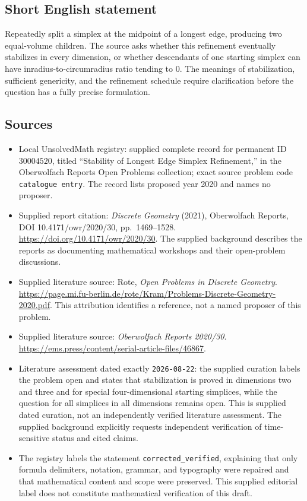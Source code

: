 \documentclass[11pt]{article}
\begin{document}
\subsection{Short English statement}
Repeatedly split a simplex at the midpoint of a longest edge, producing two equal-volume children. The source asks whether this refinement eventually stabilizes in every dimension, or whether descendants of one starting simplex can have inradius-to-circumradius ratio tending to \(0\). The meanings of stabilization, sufficient genericity, and the refinement schedule require clarification before the question has a fully precise formulation.
\subsection{Sources}
\begin{itemize}
\item Local UnsolvedMath registry: supplied complete record for permanent ID \(30004520\), titled ``Stability of Longest Edge Simplex Refinement,'' in the Oberwolfach Reports Open Problems collection; exact source problem code \texttt{catalogue entry}. The record lists proposed year 2020 and names no proposer.
\item Supplied report citation: \emph{Discrete Geometry} (2021), Oberwolfach Reports, DOI 10.4171/owr/2020/30, pp.\ 1469--1528. \url{https://doi.org/10.4171/owr/2020/30}. The supplied background describes the reports as documenting mathematical workshops and their open-problem discussions.
\item Supplied literature source: Rote, \emph{Open Problems in Discrete Geometry}. \url{https://page.mi.fu-berlin.de/rote/Kram/Problems-Discrete-Geometry-2020.pdf}. This attribution identifies a reference, not a named proposer of this problem.
\item Supplied literature source: \emph{Oberwolfach Reports 2020/30}. \url{https://ems.press/content/serial-article-files/46867}.
\item Literature assessment dated exactly \texttt{2026-08-22}: the supplied curation labels the problem open and states that stabilization is proved in dimensions two and three and for special four-dimensional starting simplices, while the question for all simplices in all dimensions remains open. This is supplied dated curation, not an independently verified literature assessment. The supplied background explicitly requests independent verification of time-sensitive status and cited claims.
\item The registry labels the statement \texttt{corrected\_verified}, explaining that only formula delimiters, notation, grammar, and typography were repaired and that mathematical content and scope were preserved. This supplied editorial label does not constitute mathematical verification of this draft.
\end{itemize}
\end{document}
